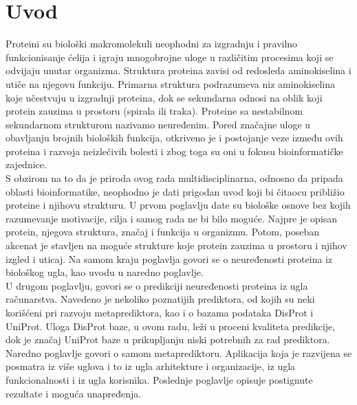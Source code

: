 
\chapter*{Uvod} %

\label{Chapter1} %


Proteini su biološki makromolekuli neophodni za izgradnju i pravilno funkcionisanje ćelija i igraju mnogobrojne uloge u različitim procesima koji se odvijaju unutar organizma. Struktura proteina zavisi od redosleda aminokiselina i utiče na njegovu funkciju. Primarna struktura podrazumeva niz aminokiselina koje učestvuju u izgradnji proteina, dok se sekundarna odnosi na oblik koji protein zauzima u prostoru (spirala ili traka). Proteine sa nestabilnom sekundarnom strukturom nazivamo neuređenim. Pored značajne uloge u obavljanju brojnih bioloških funkcija, otkriveno je i postojanje veze između ovih proteina i razvoja neizlečivih bolesti i zbog toga su oni u fokusu bioinformatičke zajednice.\\

S obzirom na to da je priroda ovog rada multidisciplinarna, odnosno da pripada oblasti bioinformatike, neophodno je dati prigodan uvod koji bi čitaocu približio proteine i njihovu strukturu. U prvom poglavlju date su biološke osnove bez kojih razumevanje motivacije, cilja i samog rada ne bi bilo moguće. Najpre je opisan protein, njegova struktura, značaj i funkcija u organizmu. Potom, poseban akcenat je stavljen na moguće strukture koje protein zauzima u prostoru i njihov izgled i uticaj. Na samom kraju poglavlja govori se o neuređenosti proteina iz biološkog ugla, kao uvodu u naredno poglavlje. \\

U drugom poglavlju, govori se o predikciji neuređenosti proteina iz ugla računarstva. Navedeno je nekoliko poznatijih prediktora, od kojih su neki  korišćeni pri razvoju metaprediktora, kao i o bazama podataka DisProt i UniProt. Uloga DisProt baze, u ovom radu, leži u proceni kvaliteta predikcije, dok je značaj UniProt baze u prikupljanju niski potrebnih za rad prediktora.\\

Naredno poglavlje govori o samom metaprediktoru. Aplikacija koja je razvijena se posmatra iz više uglova i to iz ugla arhitekture i organizacije, iz ugla funkcionalnosti i iz ugla korisnika. Poslednje poglavlje opisuje postignute rezultate i moguća unapređenja.




